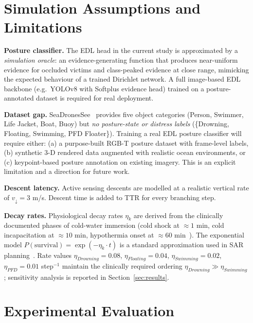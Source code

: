 \documentclass[11pt,a4paper]{article}
\begin{document}
\section{Simulation Assumptions and Limitations}

\noindent\textbf{Posture classifier.}
The EDL head in the current study is approximated by a
\emph{simulation oracle}: an evidence-generating function that produces
near-uniform evidence for occluded victims and class-peaked evidence at
close range, mimicking the expected behaviour of a trained Dirichlet
network.
A full image-based EDL backbone (e.g.\ YOLOv8 with Softplus evidence head)
trained on a posture-annotated dataset is required for real deployment.

\noindent\textbf{Dataset gap.}
SeaDronesSee~\cite{ref3} provides five object categories (Person, Swimmer,
Life Jacket, Boat, Buoy) but \emph{no posture-state or distress labels}
(\{Drowning, Floating, Swimming, PFD Floater\}).
Training a real EDL posture classifier will require either:
(a) a purpose-built RGB-T posture dataset with frame-level labels,
(b) synthetic 3-D rendered data augmented with realistic ocean environments, or
(c) keypoint-based posture annotation on existing imagery.
This is an explicit limitation and a direction for future work.

\noindent\textbf{Descent latency.}
Active sensing descents are modelled at a realistic vertical rate of
$v_\downarrow = 3$ m/s.
Descent time is added to TTR for every branching step.

\noindent\textbf{Decay rates.}
Physiological decay rates $\eta_k$ are derived from the clinically
documented phases of cold-water immersion (cold shock at $\approx 1$ min,
cold incapacitation at $\approx 10$ min, hypothermia onset at
$\approx 60$ min~\cite{tipton2011,golden2002}).
The exponential model $P(\text{survival}) = \exp(-\eta_k \cdot t)$ is a
standard approximation used in SAR planning~\cite{iamsar2019}.
Rate values $\eta_{Drowning} = 0.08$, $\eta_{Floating} = 0.04$,
$\eta_{Swimming} = 0.02$, $\eta_{PFD} = 0.01$ step$^{-1}$
maintain the clinically required ordering
$\eta_{Drowning} \gg \eta_{Swimming}$; sensitivity analysis is
reported in Section~\ref{sec:results}.

\section{Experimental Evaluation}
\end{document}
